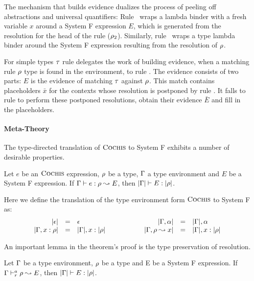 The mechanism that builds evidence dualizes the process of peeling off
abstractions and universal quantifiers: Rule ~wraps a lambda
binder with a fresh variable $x$ around a System F expression $E$, which is
generated from the resolution for the head of the rule ($\rho_2$). Similarly,
rule ~wraps a type lambda binder around the System F expression
resulting from the resolution of $\rho$.

For simple types $\tau$ rule  delegates the work of
building evidence, when a matching rule $\rho$ type is found in the
environment, to rule . The evidence consists of two parts:
$E$ is the evidence of matching $\tau$ against $\rho$. This match contains
placeholders $\bar{x}$ for the contexts whose resolution is postponed by rule
. It falls to rule  to perform these
postponed resolutions, obtain their evidence $\bar{E}$ and fill in the
placeholders.

\paragraph{Meta-Theory} The type-directed translation of $\textsc{Cochis}$ to System F exhibits a number
of desirable properties.

\begin{theorem}\label{thm:type:preservation} Let $e$ be an $\textsc{Cochis}$
  expression, $\rho$ be a type, $\Gamma$ a type environment and $E$ be a System F expression. If
  $\Gamma \vdash e:\rho \leadsto E$, then $|\Gamma| \vdash E:|\rho|$.
\end{theorem}
Here we define the translation of the type environment form $\textsc{Cochis}$ to System F as:
\begin{equation*}
\begin{array}{rcl@{\hspace{2cm}}rcl}
|\epsilon| & = & \epsilon & |\tenv,\alpha| & = & |\tenv|, \alpha \\
|\tenv,x : \rulet| & = & |\tenv|, x : |\rulet| &
|\tenv, \rulet \leadsto x| & = & |\tenv|, x : |\rulet|
\end{array}
\end{equation*}

An important lemma in the theorem's proof is the type preservation of 
resolution.
\begin{lemma}
Let $\Gamma$ be a type environment, $\rho$ be a type and E be a System F expression.
If $\Gamma \vdash^a_{r} \rho \leadsto E$, then $|\Gamma| \vdash E : |\rho|$.
\end{lemma}

